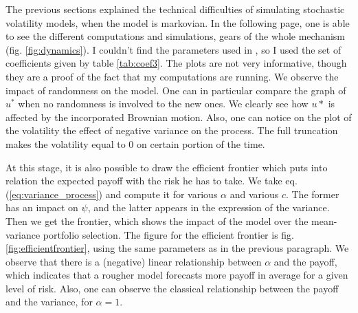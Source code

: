 The previous sections explained the technical difficulties of simulating stochastic volatility models, when the model is markovian. In the following page, one is able to see the different computations and simulations, gears of the whole mechanism (fig. \ref{fig:dynamics}). I couldn't find the parameters used in \cite{HanWong}, so I used the set of coefficients given by table \ref{tab:coef3}. The plots are not very informative, though they are a proof of the fact that my computations are running. We observe the impact of randomness on the model. One can in particular compare the graph of $u^*$ when no randomness is involved to the new ones. We clearly see how $u*$ is affected by the incorporated Brownian motion. Also, one can notice on the plot of the volatility the effect of negative variance on the process. The full truncation makes the volatility equal to 0 on certain portion of the time.

At this stage, it is also possible to draw the efficient frontier which puts into relation the expected payoff with the risk he has to take. We take eq. (\ref{eq:variance_process}) and compute it for various $\alpha$ and various $c$. The former has an impact on $\psi$, and the latter appears in the expression of the variance.  Then we get the frontier, which shows the impact of the model over the mean-variance portfolio selection. The figure for the efficient frontier is fig. \ref{fig:efficientfrontier}, using the same parameters as in the previous paragraph. We observe that there is a (negative) linear relationship between $\alpha$ and the payoff, which indicates that a rougher model forecasts more payoff in average for a given level of risk. Also, one can observe the classical relationship between the payoff and the variance, for $\alpha = 1$.



